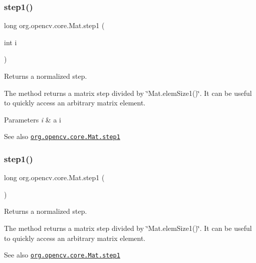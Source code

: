 \subsubsection{\texorpdfstring{step1()}{step1()}\hspace{0.1cm}{\footnotesize\ttfamily [1/2]}}
{\footnotesize\ttfamily long org.\+opencv.\+core.\+Mat.\+step1 (\begin{DoxyParamCaption}\item[{int}]{i }\end{DoxyParamCaption})}

Returns a normalized step.

The method returns a matrix step divided by \char`\"{}\+Mat.\+elem\+Size1()\char`\"{}. It can be useful to quickly access an arbitrary matrix element.


\begin{DoxyParams}{Parameters}
{\em i} & a i\\
\hline
\end{DoxyParams}
\begin{DoxySeeAlso}{See also}
\href{http://docs.opencv.org/modules/core/doc/basic_structures.html#mat-step1}{\tt org.\+opencv.\+core.\+Mat.\+step1} 
\end{DoxySeeAlso}
\mbox{\label{classorg_1_1opencv_1_1core_1_1_mat_a657e61de4cb505cb637e8e88b12ac479}} 
\subsubsection{\texorpdfstring{step1()}{step1()}\hspace{0.1cm}{\footnotesize\ttfamily [2/2]}}
{\footnotesize\ttfamily long org.\+opencv.\+core.\+Mat.\+step1 (\begin{DoxyParamCaption}{ }\end{DoxyParamCaption})}

Returns a normalized step.

The method returns a matrix step divided by \char`\"{}\+Mat.\+elem\+Size1()\char`\"{}. It can be useful to quickly access an arbitrary matrix element.

\begin{DoxySeeAlso}{See also}
\href{http://docs.opencv.org/modules/core/doc/basic_structures.html#mat-step1}{\tt org.\+opencv.\+core.\+Mat.\+step1} 
\end{DoxySeeAlso}
\mbox{\label{classorg_1_1opencv_1_1core_1_1_mat_a3d3b68f34a2c1c3aaa56b1c75f09ae60}} 
